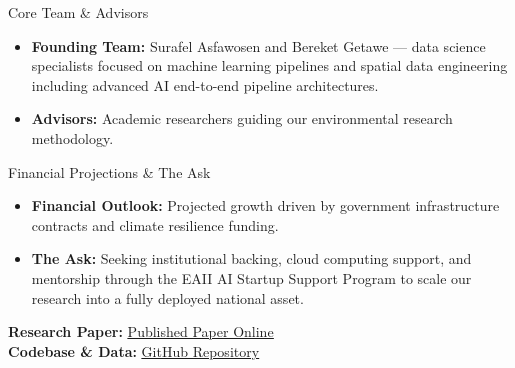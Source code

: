 \documentclass[aspectratio=43]{beamer}
\begin{document}
\begin{frame}{Core Team \& Advisors}
    \vspace{0.6cm}
    \begin{itemize}
        \setlength\itemsep{1.5em}
        \item \textbf{Founding Team:} Surafel Asfawosen and Bereket Getawe — data science specialists focused on machine learning pipelines and spatial data engineering including advanced AI end-to-end pipeline architectures.
        \item \textbf{Advisors:} Academic researchers guiding our environmental research methodology.
    \end{itemize}
\end{frame}

\begin{frame}{Financial Projections \& The Ask}
    \vspace{0.4cm}
    \begin{itemize}
        \setlength\itemsep{1.1em}
        \item \textbf{Financial Outlook:} Projected growth driven by government infrastructure contracts and climate resilience funding.
        \item \textbf{The Ask:} Seeking institutional backing, cloud computing support, and mentorship through the EAII AI Startup Support Program to scale our research into a fully deployed national asset.
    \end{itemize}
    \vspace{0.4cm}
    \centering
    \footnotesize
    \textbf{Research Paper:} \href{https://surafelasfawosen.github.io/ethiopia-soil-erosion-predictor-ai/paper.html}{\color{blue}\underline{Published Paper Online}} \\
    \textbf{Codebase \& Data:} \href{https://github.com/surafelasfawosen/ethiopia-soil-erosion-predictor-ai}{\color{blue}\underline{GitHub Repository}}
\end{frame}
\end{document}
